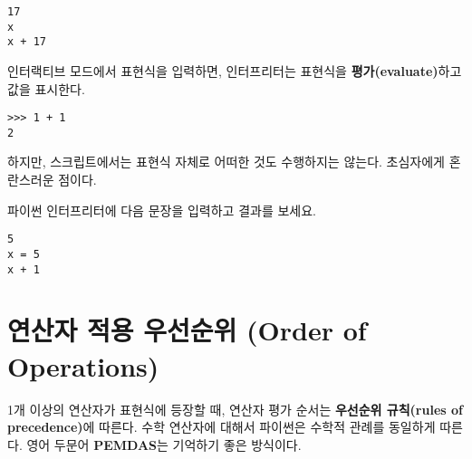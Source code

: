 
\beforeverb
\begin{verbatim}
17
x
x + 17
\end{verbatim}
\afterverb
%

인터랙티브 모드에서 표현식을 입력하면, 인터프리터는 표현식을 {\bf 평가(evaluate)}하고 값을 표시한다.

\beforeverb
\begin{verbatim}
>>> 1 + 1
2
\end{verbatim}
\afterverb
%

하지만, 스크립트에서는 표현식 자체로 어떠한 것도 수행하지는 않는다. 초심자에게 혼란스러운 점이다.

\begin{ex}

파이썬 인터프리터에 다음 문장을 입력하고 결과를 보세요.

\beforeverb
\begin{verbatim}
5
x = 5
x + 1
\end{verbatim}
\afterverb
%
\end{ex}


\section{연산자 적용 우선순위 (Order of Operations)}

1개 이상의 연산자가 표현식에 등장할 때, 
연산자 평가 순서는 {\bf  우선순위 규칙(rules of precedence)}에 따른다. 
수학 연산자에 대해서 파이썬은 수학적 관례를 동일하게 따른다. 영어 두문어 {\bf PEMDAS}는 기억하기 좋은 방식이다.


